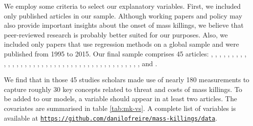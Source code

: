 \documentclass[a4paper,12pt]{article}
\begin{document}
We employ some criteria to select our explanatory variables. First, we included only published articles in our sample. Although working papers and policy may also provide important insights about the onset of mass killings, we believe that peer-reviewed research is probably better suited for our purposes. Also, we included only papers that use regression methods on a global sample and were published from 1995 to 2015. Our final sample comprises 45 articles: \citet{anderton2015new}, \citet{balcells2010rivalry, balcells2011continuation}, \citet{besanccon2005relative}, \citet{bulutgil2015social}, \citet{bundervoet2009livestock}, \citet{clayton2016civilianizing}, \citet{colaresi2008kill}, \citet{downes2006desperate, downes2007restraint},  \citet{easterly2006development}, \citet{eck2007one}, \citet{esteban2015strategic}, \citet{fazal2015particular}, \citet{fjelde2014weakening}, \citet{goldsmith2013forecasting}, \citet{harff2003no}, \citet{joshi2017kills}, \citet{kim2010makes}, \citet{kim2016revolutionary}, \citet{kisangani2007political}, \citet{koren2017means}, \citet{krain1997state}, \citet{manekin2013violence}, \citet{mcdoom2013killed,mcdoom2014predicting}, \citet{melander2009new}, \citet{montalvo2008discrete}, \citet{pilster2016differentiation}, \citet{querido2009state}, \citet{raleigh2012violence}, \citet{rost2013will}, \citet{rummel1995democracy}, \citet{schneider2013accounting}, \citet{siroky2015empire}, \citet{stanton2015regulating}, \citet{sullivan2012blood}, \citet{tir2008domestic}, \citet{ulfelder2008assessing}, \citet{ulfelder2012forecasting}, \citet{uzonyi2015civil, uzonyi2016domestic} \citet{valentino2004draining}, \citet{valentino2006covenants}, \citet{verpoorten2012leave}, \citet{wayman2010explaining}, \citet{wig2016local}, and \citet{yanagizawa2014propaganda}.

We find that in those 45 studies scholars made use of nearly 180 measurements to capture roughly 30 key concepts related to threat and costs of mass killings. To be added to our models, a variable should appear in at least two articles. The covariates are summarised in table \ref{tab:mk-vs}. A complete list of variables is available at \href{https://github.com/danilofreire/mass-killings/data}{\texttt{https://github.com/danilofreire/mass-killings/data}}.
\end{document}
